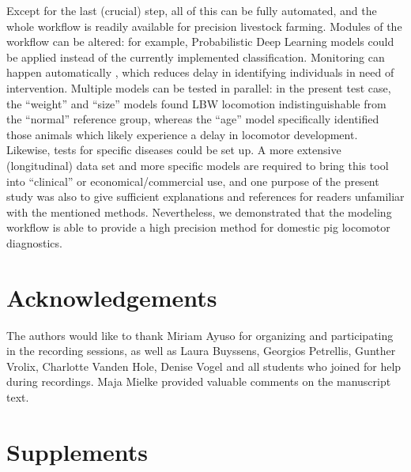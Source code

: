 Except for the last (crucial) step, all of this can be fully automated, and the whole workflow is readily available for precision livestock farming.
Modules of the workflow can be altered: for example, Probabilistic Deep Learning models could be applied instead of the currently implemented classification.
Monitoring can happen automatically \citep[as in][]{Litten2003,Netukova2021}, which reduces delay in identifying individuals in need of intervention.
Multiple models can be tested in parallel: in the present test case, the ``weight'' and ``size'' models found LBW locomotion indistinguishable from the ``normal'' reference group, whereas the ``age'' model specifically identified those animals which likely experience a delay in locomotor development.
Likewise, tests for specific diseases could be set up.
A more extensive (longitudinal) data set and more specific models are required to bring this tool into ``clinical'' or economical/commercial use, and one purpose of the present study was also to give sufficient explanations and references for readers unfamiliar with the mentioned methods.
Nevertheless, we demonstrated that the modeling workflow is able to provide a high precision method for domestic pig locomotor diagnostics.




\FloatBarrier
\clearpage
\section{Acknowledgements}
\label{sec:org2d8bfbc}
The authors would like to thank Miriam Ayuso for organizing and participating in the recording sessions, as well as Laura Buyssens, Georgios Petrellis, Gunther Vrolix, Charlotte Vanden Hole, Denise Vogel and all students who joined for help during recordings.
Maja Mielke provided valuable comments on the manuscript text.


\FloatBarrier
\clearpage
\section{Supplements}
\label{supplements}
